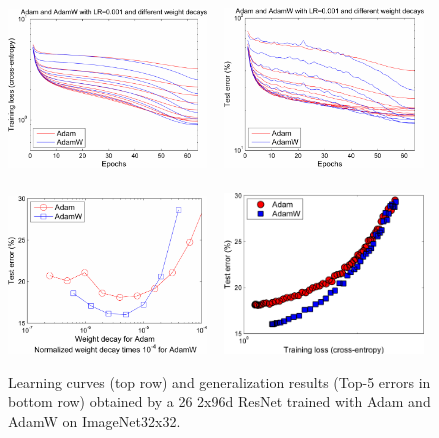 \documentclass[usenames,dvipsnames]{article} %
\begin{document}
\begin{figure}[t]%
	\includegraphics[width=0.47\textwidth]{ImageNetAdam_AdamWR0_2.pdf} $\;\;$
  \includegraphics[width=0.47\textwidth]{ImageNetAdam_AdamWR0_5.pdf}\\
	$\;\;$\\
	\includegraphics[width=0.47\textwidth]{ImageNetAdam_AdamWR1_5.pdf} $\;\;$
  \includegraphics[width=0.47\textwidth]{ImageNetAdam_AdamWR2_2.pdf}
\caption{\label{fig64ImageNet} Learning curves (top row) and generalization results (Top-5 errors in bottom row) obtained by a 26 2x96d ResNet trained with Adam and AdamW on ImageNet32x32.}
\end{figure}
\end{document}
